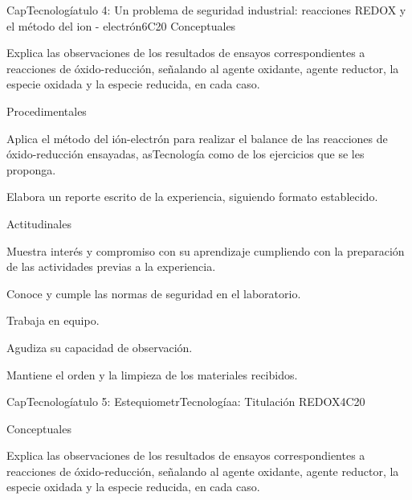\begin{syllabus}
\begin{unit}{CapTecnologíatulo 4: Un problema de seguridad industrial: reacciones REDOX y el método del ion - electrón}{}{}{6}{C20}
Conceptuales

\begin{topics}
      \item  Explica las observaciones de los resultados de ensayos correspondientes a reacciones de óxido-reducción, señalando al agente oxidante, agente reductor, la especie oxidada y la especie reducida, en cada caso.
   \end{topics}
   
   Procedimentales

\begin{topics}
      \item Aplica el método del ión-electrón para realizar el balance de las reacciones de óxido-reducción ensayadas, asTecnología como de los ejercicios que se les proponga.
      \item Elabora un reporte escrito de la experiencia, siguiendo formato establecido.
   \end{topics}
   
   Actitudinales

\begin{topics}
      \item Muestra interés y compromiso con su aprendizaje cumpliendo con la preparación de las actividades previas a la experiencia.
      \item Conoce y cumple las normas de seguridad en el laboratorio.
      \item Trabaja en equipo.
      \item Agudiza su capacidad de observación.
     \item Mantiene el orden y la limpieza de los materiales recibidos.
   \end{topics}

   \begin{learningoutcomes}
      \item 
   \end{learningoutcomes}
   
\end{unit}

\begin{unit}{CapTecnologíatulo 5:  EstequiometrTecnologíaa: Titulación REDOX}{}{}{4}{C20}

Conceptuales

\begin{topics}
      \item  Explica las observaciones de los resultados de ensayos correspondientes a reacciones de óxido-reducción, señalando al agente oxidante, agente reductor, la especie oxidada y la especie reducida, en cada caso.
   \end{topics}
   

\end{unit}
\end{syllabus}
